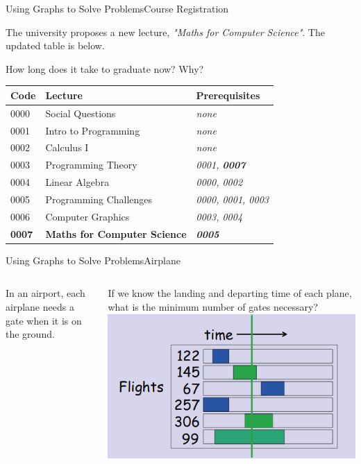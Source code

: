 \begin{frame}{Using Graphs to Solve Problems}{Course Registration}

  The university proposes a new lecture, \emph{"Maths for Computer Science"}. The updated table is below. \medskip

  How long does it take to graduate now? Why?

  \begin{tabular}{p{}|p{}||p{}}
    \hline
    Code & Lecture & Prerequisites \\
    \hline
    0000 & {\small Social Questions} & \emph{none} \\
    0001 & {\small Intro to Programming} & \emph{none} \\
    0002 & {\small Calculus I} & \emph{none} \\
    0003 & {\small Programming Theory} & \emph{0001, {\bf 0007}} \\
    0004 & {\small Linear Algebra} & \emph{0000, 0002} \\
    0005 & {\small Programming Challenges} & \emph{0000, 0001, 0003} \\
    0006 & {\small Computer Graphics} & \emph{0003, 0004} \\
    {\bf 0007} & {\small {\bf Maths for Computer Science}} & {\bf\emph{0005}} \\
    \hline
  \end{tabular}
\end{frame}

\begin{frame}{Using Graphs to Solve Problems}{Airplane}
  \begin{columns}

    In an airport, each airplane needs a gate when it is on the ground.\medskip

    If we know the landing and departing time of each plane, what is the minimum number of gates necessary?
    \includegraphics[width=\textwidth]{../img/gatetable}
  \end{columns}
\end{frame}

